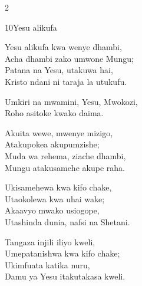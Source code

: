 \documentclass{article}
\begin{document}
\begin{multicols}{2}
\begin{hymn}{10}{Yesu alikufa}{}
\begin{stanza}
Yesu alikufa kwa wenye dhambi,\\
Acha dhambi zako umwone Mungu;\\
Patana na Yesu, utakuwa hai,\\
Kristo ndani ni taraja la utukufu.
\end{stanza}
\begin{chorus}
Umkiri na mwamini, Yesu, Mwokozi,\\
Roho asitoke kwako daima.
\end{chorus}
\begin{stanza}
Akuita wewe, mwenye mizigo,\\
Atakupokea akupumzishe;\\
Muda wa rehema, ziache dhambi,\\
Mungu atakusamehe akupe raha.
\end{stanza}
\begin{stanza}
Ukisamehewa kwa kifo chake,\\
Utaokolewa kwa uhai wake;\\
Akaavyo mwako usiogope,\\
Utashinda dunia, nafsi na Shetani.
\end{stanza}
\begin{stanza}
Tangaza injili iliyo kweli,\\
Umepatanishwa kwa kifo chake;\\
Ukimfuata katika nuru,\\
Damu ya Yesu itakutakasa kweli.
\end{stanza}
\end{hymn}


\end{multicols}
\end{document}

